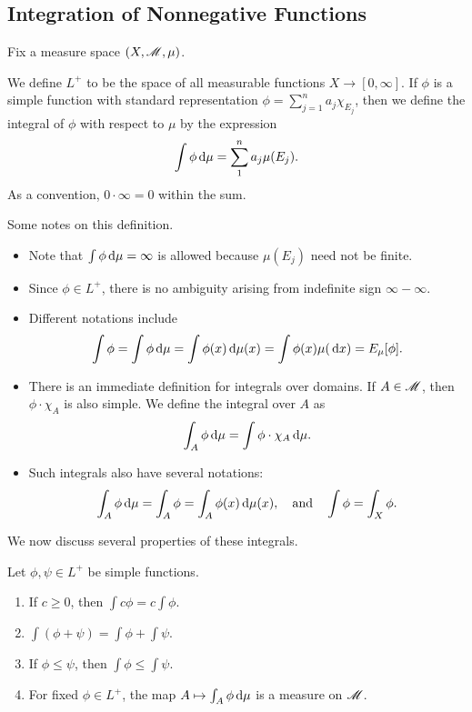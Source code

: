\documentclass[12pt]{article} %
\begin{document}
\subsection{Integration of Nonnegative Functions}

Fix a measure space $(X, \mathscr{M}, \mu)$.

\begin{definition}
    We define $L^+$ to be the space of all measurable functions $X \to [0,\infty]$. If $\phi$ is a simple function with standard representation $\phi = \sum_{j=1}^n a_j \chi_{E_j}$, then we define the integral of $\phi$ with respect to $\mu$ by the expression \[\int \phi \, \mathrm{d} \mu = \sum_1^n a_j \mu(E_j).\] As a convention, $0 \cdot \infty = 0$ within the sum.
\end{definition}

\begin{remark}
    Some notes on this definition.
    \begin{itemize}
        \item Note that $\int \phi \, \mathrm{d} \mu = \infty$ is allowed because $\mu(E_j)$ need not be finite.
        \item Since $\phi \in L^+$, there is no ambiguity arising from indefinite sign $\infty - \infty$.
        \item Different notations include \[\int\phi = \int \phi \, \mathrm{d} \mu = \int \phi(x) \, \mathrm{d} \mu(x) = \int \phi(x) \mu(\, \mathrm{d} x) = E_\mu[\phi].\]
        \item There is an immediate definition for integrals over domains. If $A \in \mathscr{M}$, then $\phi \cdot \chi_A$ is also simple. We define the integral over $A$ as \[\int_A \phi \, \mathrm{d} \mu = \int \phi \cdot \chi_A \, \mathrm{d} \mu.\]
        \item Such integrals also have several notations: \[\int_A \phi \, \mathrm{d} \mu = \int_A \phi = \int_A \phi(x) \, \mathrm{d} \mu(x), \ \ \ \text{and} \ \ \ \int \phi = \int_X \phi.\]
    \end{itemize}
\end{remark}

We now discuss several properties of these integrals.

\begin{proposition}
    Let $\phi, \psi \in L^+$ be simple functions. \begin{enumerate}
        \item If $c \geq 0$, then $\int c \phi = c \int \phi$.
        \item $\int (\phi + \psi) = \int \phi + \int \psi$.
        \item If $\phi \leq \psi$, then $\int \phi \leq \int \psi$.
        \item For fixed $\phi \in L^+$, the map $A \mapsto \int_A \phi \, \mathrm{d} \mu$ is a measure on $\mathscr{M}$.
    \end{enumerate}
\end{proposition}
\end{document}
